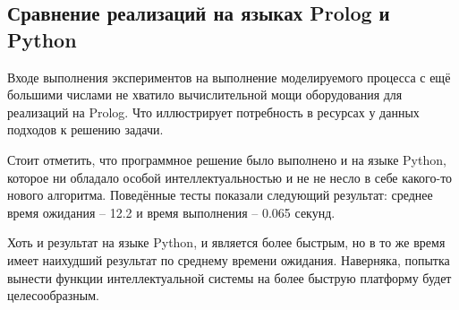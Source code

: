	\subsection{Сравнение реализаций на языках Prolog и Python}

		Входе выполнения экспериментов на выполнение моделируемого процесса с ещё большими числами не хватило вычислительной мощи
			оборудования для реализаций на Prolog. Что иллюстрирует потребность в ресурсах у данных подходов
			к решению задачи.
		
		Стоит отметить, что программное решение было выполнено и на языке Python, которое ни обладало
			особой интеллектуальностью и не не несло в себе какого-то нового алгоритма. Поведённые тесты
			показали следующий результат: среднее время ожидания -- 12.2 и время выполнения -- 0.065 секунд.

		Хоть и результат на языке Python, и является более быстрым, но в то же время имеет наихудший результат
			по среднему времени ожидания. Наверняка, попытка вынести функции интеллектуальной системы 
			на более быструю платформу будет целесообразным.
